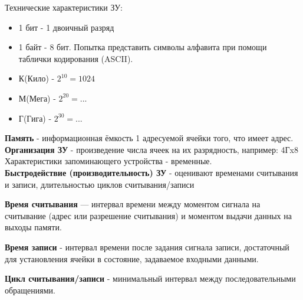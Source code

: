 \documentclass[12px]{article}
\begin{document}
Технические характеристики ЗУ: 
\begin{itemize}
    \item 1 бит - 1 двоичный разряд
    \item 1 байт - 8 бит. Попытка представить символы алфавита при помощи таблички кодирования (ASCII).
    \item К(Кило) - $2^{10} = 1024$
    \item М(Мега) - $2^{20} = ... $ 
    \item Г(Гига) - $2^{30} = ... $
\end{itemize}

\textbf{Память} - информационная ёмкость 1 адресуемой ячейки того, что имеет адрес. \\

\textbf{Организация ЗУ} - произведение числа ячеек на их разрядность, например: 4Гx8\\
Характеристики запоминающего устройства - временные.\\

\textbf{Быстродействие (производительность) ЗУ} - оценивают временами считывания и записи, длительностью циклов считывания/записи

\textbf{Время считывания} — интервал времени между моментом сигнала на считывание (адрес или разрешение считывания) и моментом выдачи данных на выходы памяти.

\textbf{Время записи} - интервал времени после задания сигнала записи, достаточный для установления ячейки в состояние, задаваемое входными данными.

\textbf{Цикл считывания/записи} - минимальный интервал между последовательными обращениями.
\end{document}
